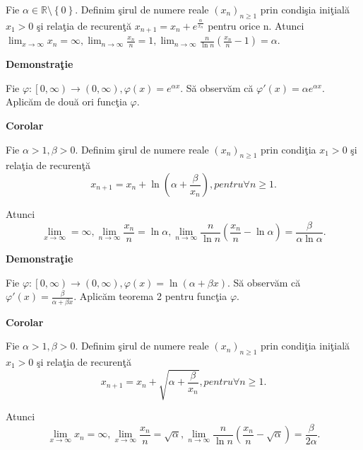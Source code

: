 \documentclass[a4paper,12pt,oneside]{report}
\begin{document}
Fie \(\alpha \in \mathbb{R} \setminus \left \{ 0 \right \}\). Definim \c sirul de numere reale \(\left ( x_{n} \right )_{n\geq 1}\) prin condi\c sia ini\c tial\u a \(x_{1}> 0\) \c si rela\c tia de recuren\c t\u a \(x_{n+1}= x_{n}+ e^{\frac{\alpha }{x_{n}}}\) pentru orice n. 
Atunci \(\lim_{x \to \infty }x_{n} = \infty , \lim_{n \to \infty }\frac{x_{n}}{n} = 1, \lim_{n \to \infty }\frac{n}{\ln n }\left ( \frac{x_{n}}{n} -1\right ) = \alpha\). 

\textbf{Demonstra\c tie} 

Fie \(\varphi :\left [ 0,\infty  \right ) \to \left ( 0,\infty \right ), \varphi \left ( x \right ) = e^{\alpha x}\). S\u a observ\u am c\u a \({\varphi }'\left ( x \right ) = \alpha e^{\alpha x}\). Aplic\u am de dou\u a ori func\c tia \(\varphi\). 

\textbf{Corolar} 

Fie \(\alpha > 1,\beta > 0\). Definim \c sirul de numere reale \(\left ( x_{n} \right )_{n\geq 1}\) prin condi\c tia \(x_{1} > 0\) \c si rela\c tia de recuren\c t\u a 
\begin{displaymath}
  x_{n+1} = x_{n} + \ln\left ( \alpha +\frac{\beta }{x_{n}} \right ), pentru \forall n\geq 1.
\end{displaymath}


Atunci 
\begin{displaymath}
  \lim_{x \to \infty }=\infty ,\lim_{n \to \infty }\frac{x_{n}}{n} = \ln \alpha , \lim_{n \to \infty }\frac{n}{\ln n}\left ( \frac{x_{n}}{n} - \ln \alpha \right ) = \frac{\beta }{\alpha \ln \alpha }.
\end{displaymath}
 
\textbf{Demonstra\c tie} 

Fie \(\varphi :\left [ 0,\infty  \right ) \to \left ( 0,\infty  \right ), \varphi \left ( x \right ) = \ln \left ( \alpha   + \beta x \right )\). S\u a observ\u am c\u a \({\varphi }'\left ( x \right ) = \frac{\beta }{\alpha +\beta x}\). Aplic\u am teorema 2 pentru func\c tia \(\varphi\).

\textbf{Corolar} 

Fie \(\alpha > 1,\beta > 0\). Definim \c sirul de numere reale \(\left ( x_{n} \right )_{n\geq 1}\) prin condi\c tia ini\c tial\u a \(x_{1}> 0\) \c si rela\c tia de recuren\c t\u a
\begin{displaymath}
  x_{n+1} = x_{n} + \sqrt{\alpha +\frac{\beta }{x_{n}}}, pentru \forall n\geq 1.
\end{displaymath}


Atunci 
\begin{displaymath}
  \lim_{x \to \infty }x_{n} = \infty , \lim_{x \to \infty }\frac{x_{n}}{n} = \sqrt{\alpha }, \lim_{n \to \infty }\frac{n}{\ln n}\left ( \frac{x_{n}}{n} -\sqrt{\alpha }\right ) = \frac{\beta }{2\alpha }. 
\end{displaymath}
\end{document}
